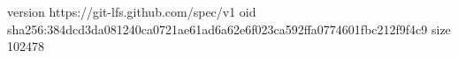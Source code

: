 version https://git-lfs.github.com/spec/v1
oid sha256:384dcd3da081240ca0721ae61ad6a62e6f023ca592ffa0774601fbc212f9f4c9
size 102478
